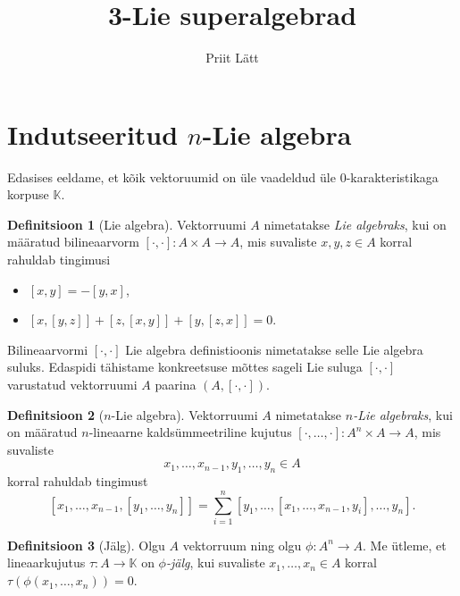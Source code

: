 \documentclass[12pt,a4paper]{article}
\author{Priit Lätt}
\title{3-Lie superalgebrad}
\theoremstyle{plain}
\theoremstyle{definition}
\newtheorem{dfn}{Definitsioon}[section]
\newcommand{\K}{\mathbb{K}}
\newcommand{\col}{\colon}
\newcommand{\arr}{\rightarrow}
\newcommand{\brac}[2]{\ensuremath{\left[ #1, #2 \right]}}
\newcommand{\nbrac}[2]{\ensuremath{\left[ #1, \dots, #2 \right]}}
\begin{document}

\section{Indutseeritud \texorpdfstring{$n$}\ -Lie algebra}

Edasises eeldame, et kõik vektoruumid on üle vaadeldud üle
$0$-karakteristikaga korpuse $\K$.

\begin{dfn}[Lie algebra]\label{def:lie_algebra}
    Vektorruumi $A$ nimetatakse \emph{Lie algebraks}, kui on
    määratud bilineaarvorm
    $\brac{\cdot}{\cdot} \colon A \times A \arr A$, mis
    suvaliste $x, y, z \in A$ korral rahuldab tingimusi
    \begin{itemize}
        \item $\brac{x}{y} = -\brac{y}{x}$,
        \item $\brac{x}{\brac{y}{z}} + 
               \brac{z}{\brac{x}{y}} +
               \brac{y}{\brac{z}{x}} = 0$.
    \end{itemize}
\end{dfn}

Bilineaarvormi $\brac{\cdot}{\cdot}$ Lie algebra definistioonis
nimetatakse selle Lie algebra suluks. Edaspidi tähistame konkreetsuse
mõttes sageli Lie suluga $\brac{\cdot}{\cdot}$ varustatud vektorruumi
$A$ paarina $(A, \brac{\cdot}{\cdot})$.

\begin{dfn}[$n$-Lie algebra]
    Vektorruumi $A$ nimetatakse \emph{$n$-Lie algebraks}, kui on
    määratud $n$-lineaarne kaldsümmeetriline kujutus
    $\nbrac{\cdot}{\cdot} \colon A^n \times A \arr A$, mis
    suvaliste
    \[ x_1, \dots, x_{n-1}, y_1, \dots, y_n \in A \]
    korral rahuldab tingimust
    \[
        \left[ x_1, \dots, x_{n-1}, \nbrac{y_1}{y_n} \right] =
        \sum_{i=1}^n \left[
            y_1, \dots, \left[ x_1, \dots, x_{n-1}, y_i \right], \dots, y_n
        \right].
    \]
\end{dfn}

\begin{dfn}[Jälg]
    Olgu $A$ vektorruum ning olgu $\phi \col A^n \arr A$. Me
    ütleme, et lineaarkujutus $\tau \col A \arr \K$ on
    \emph{$\phi$-jälg}, kui suvaliste $x_1, \dots, x_n \in A$ korral
    $\tau \left( \phi \left( x_1, \dots, x_n \right) \right) = 0$.
\end{dfn}
\end{document}
